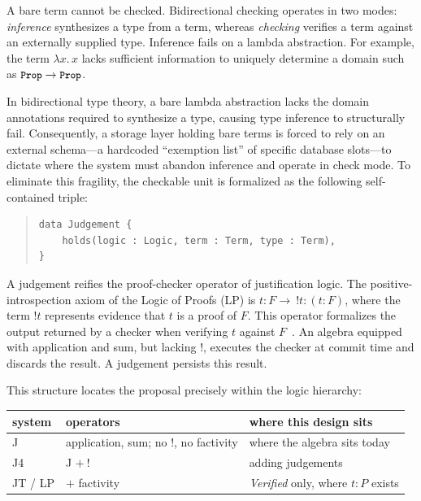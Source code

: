 \documentclass[manuscript,nonacm=true]{acmart}
\newcommand{\code}[1]{\texttt{\small #1}}
\newcommand{\Prop}{\code{Prop}}
\begin{document}
A bare term cannot be checked. Bidirectional checking operates in two modes: \emph{inference} synthesizes a type from a term, whereas \emph{checking} verifies a term against an externally supplied type. Inference fails on a lambda abstraction. For example, the term $\lambda x.\,x$ lacks sufficient information to uniquely determine a domain such as $\Prop \rightarrow \Prop$.

In bidirectional type theory, a bare lambda abstraction lacks the domain annotations required to synthesize a type, causing type inference to structurally fail. Consequently, a storage layer holding bare terms is forced to rely on an external schema---a hardcoded ``exemption list'' of specific database slots---to dictate where the system must abandon inference and operate in check mode. To eliminate this fragility, the checkable unit is formalized as the following self-contained triple:

\begin{quote}
\begin{verbatim}
data Judgement {
    holds(logic : Logic, term : Term, type : Term),
}
\end{verbatim}
\end{quote}

A judgement reifies the proof-checker operator of justification logic. The positive-introspection axiom of the Logic of Proofs (LP) is $t{:}F \rightarrow\ !t{:}(t{:}F)$, where the term $!t$ represents evidence that $t$ is a proof of $F$. This operator formalizes the output returned by a checker when verifying $t$ against $F$~\cite{af19}. An algebra equipped with application and sum, but lacking $!$, executes the checker at commit time and discards the result. A judgement persists this result.

This structure locates the proposal precisely within the logic hierarchy:

\begin{table}[h]
\small
\begin{tabular}{@{}lll@{}}
\toprule
\textbf{system} & \textbf{operators} & \textbf{where this design sits} \\
\midrule
J & application, sum; no $!$, no factivity & where the algebra sits today \\
J4 & J $+\ !$ & adding judgements \\
JT / LP & $+$ factivity & \emph{Verified} only, where $t : P$ exists \\
\bottomrule
\end{tabular}
\end{table}
\end{document}
